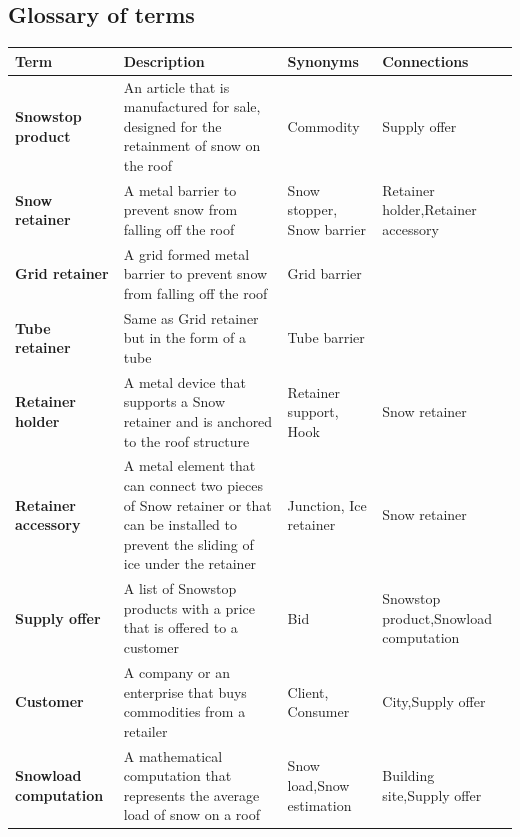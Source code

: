 \documentclass{article}[h]
\begin{document}
\pagebreak


\subsection{Glossary of terms}\label{glossary}
  \begin{table}[H]
    \centering
  \def\arraystretch{1.25}%
  \begin{tabular}{ | m{3.5cm} | m{4cm}| m{3cm} | m{3cm} |} 
    \hline
    {\textbf{\large Term}} & {\textbf{\large Description}} & {\textbf{\large Synonyms}} & {\textbf{\large Connections}} \\ 
    \hline
    \color[HTML]{3531FF} \textbf{Snowstop product} & An article that is manufactured for sale, designed for the retainment of snow on the roof & Commodity & Supply offer \\ 
    \hline
    \color[HTML]{3531FF} \textbf{Snow retainer} & A metal barrier to prevent snow from falling off the roof & Snow stopper, Snow barrier & Retainer holder,\newline Retainer accessory \\ 
    \hline
    \color[HTML]{3531FF} \textbf{Grid retainer} & A grid formed metal barrier to prevent snow from falling off the roof & Grid barrier & \\ 
    \hline
    \color[HTML]{3531FF} \textbf{Tube retainer} & Same as Grid retainer but in the form of a tube & Tube barrier &  \\ 
    \hline
    \color[HTML]{3531FF} \textbf{Retainer holder} & A metal device that supports a Snow retainer and is anchored to the roof structure & Retainer support, Hook & Snow retainer \\ 
    \hline
    \color[HTML]{3531FF} \textbf{Retainer accessory} & A metal element that can connect two pieces of Snow retainer or that can be installed to prevent the sliding of ice under the retainer & Junction, Ice retainer & Snow retainer \\ 
    \hline
    \color[HTML]{3531FF} \textbf{Supply offer} & A list of Snowstop products with a price that is offered to a customer & Bid & Snowstop product,\newline Snowload computation \\ 
    \hline
    \color[HTML]{3531FF} \textbf{Customer} & A company or an enterprise that buys commodities from a retailer & Client, Consumer & City,\newline Supply offer \\ 
    \hline
    \color[HTML]{3531FF} \textbf{Snowload computation} & A mathematical computation that represents the average load of snow on a roof & Snow load,\newline Snow estimation & Building site,\newline Supply offer \\ 

\end{tabular}
\end{table}
\end{document}

